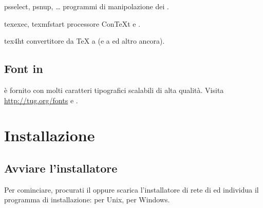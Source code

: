 \documentclass{article}
\begin{document}
\begin{cmddescription}
\item [psselect, psnup, \ldots] programmi di manipolazione dei \PS{}.

\item [texexec, texmfstart] processore Con\TeX{}t e .

\item [tex4ht] convertitore da \TeX{} a  (e a  ed
altro ancora).

\end{cmddescription}


\subsection{Font in \protect\TL}
\label{sec:tl-fonts}

\TL{} è fornito con molti caratteri tipografici scalabili di alta qualità.
Visita \url{http://tug.org/fonts} e
.


\section{Installazione}
\label{sec:install}

\subsection{Avviare l'installatore}
\label{sec:inst-start}

Per cominciare, procurati il \DVD{} \TL{} oppure scarica l'installatore di
rete di \TL{} ed individua il programma di installazione:
 per Unix,  per Windows.
\end{document}
